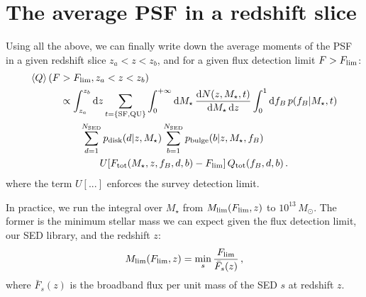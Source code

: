 \documentclass[11pt,a4paper]{article}
\newcommand\mean[1]{\left< #1 \right>}
\newcommand{\msun}{M_\odot}
\newcommand{\mstar}{M_\star}
\newcommand{\dd}{\mathrm{d}}
\numberwithin{equation}{section}
\begin{document}
\section{The average PSF in a redshift slice}

Using all the above, we can finally write down the average moments of the PSF in a given redshift slice $z_a < z < z_b$, and for a given flux detection limit $F > F_{\rm lim}$:
\begin{align}
\mean{Q}(F &> F_{\rm lim}, z_a < z < z_b) \nonumber \\
&\propto \int_{z_a}^{z_b}\dd z\sum_{t=\{{\rm SF,QU}\}}\int_0^{+\infty} \dd \mstar\,\frac{\dd N(z, \mstar, t)}{\dd \mstar\, \dd z} \int_0^1\dd f_B\,p(f_B | \mstar,t) \nonumber \\
&\quad\quad \sum_{d=1}^{N_{\rm SED}} p_{\rm disk}(d | z,\mstar) \sum_{b=1}^{N_{\rm SED}}p_{\rm bulge}(b | z,\mstar,f_B) \nonumber \\
&\quad\quad\quad\quad U[F_{\rm tot}(\mstar, z, f_B, d, b) - F_{\rm lim}]\,Q_{\rm tot}(f_B, d, b)\,.
\end{align}
where the term $U[...]$ enforces the survey detection limit.

In practice, we run the integral over $\mstar$ from $M_{\rm lim}(F_{\rm lim},z)$ to $10^{13}\,\msun$. The former is the minimum stellar mass we can expect given the flux detection limit, our SED library, and the redshift $z$:
\begin{align}
M_{\rm lim}(F_{\rm lim},z) = \min_{s} \frac{F_{\rm lim}}{\bar{F}_s(z)}\,,
\end{align}
where $\bar{F}_s(z)$ is the broadband flux per unit mass of the SED $s$ at redshift $z$.
\end{document}
